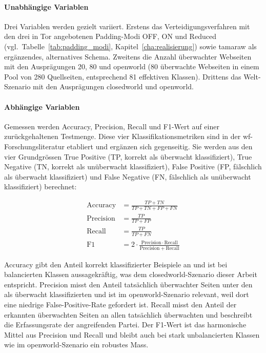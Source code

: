 \paragraph{Unabhängige Variablen}
Drei Variablen werden gezielt variiert.
Erstens das Verteidigungsverfahren mit den drei in Tor angebotenen Padding-Modi OFF, ON und Reduced (vgl.\ Tabelle~\ref{tab:padding_modi}, Kapitel~\ref{cha:realisierung}) sowie \gls{tamaraw} als ergänzendes, alternatives Schema.
Zweitens die Anzahl überwachter Webseiten mit den Ausprägungen 20, 80 und \gls{openworld} (80 überwachte Webseiten in einem Pool von 280 Quellseiten, entsprechend 81 effektiven Klassen).
Drittens das Welt-Szenario mit den Ausprägungen \gls{closedworld} und \gls{openworld}.

\paragraph{Abhängige Variablen}
Gemessen werden Accuracy, Precision, Recall und F1-Wert auf einer zurückgehaltenen Testmenge.
Diese vier Klassifikationsmetriken sind in der \gls{wf}-Forschungsliteratur etabliert und ergänzen sich gegenseitig.
Sie werden aus den vier Grundgrössen True Positive (TP, korrekt als überwacht klassifiziert), True Negative (TN, korrekt als unüberwacht klassifiziert), False Positive (FP, fälschlich als überwacht klassifiziert) und False Negative (FN, fälschlich als unüberwacht klassifiziert) berechnet:

\begin{align}
\mathrm{Accuracy}  &= \frac{TP + TN}{TP + TN + FP + FN} \\
\mathrm{Precision} &= \frac{TP}{TP + FP} \\
\mathrm{Recall}    &= \frac{TP}{TP + FN} \\
\mathrm{F1}        &= 2 \cdot \frac{\mathrm{Precision} \cdot \mathrm{Recall}}{\mathrm{Precision} + \mathrm{Recall}}
\end{align}

Accuracy gibt den Anteil korrekt klassifizierter Beispiele an und ist bei balancierten Klassen aussagekräftig, was dem \gls{closedworld}-Szenario dieser Arbeit entspricht.
Precision misst den Anteil tatsächlich überwachter Seiten unter den als überwacht klassifizierten und ist im \gls{openworld}-Szenario relevant, weil dort eine niedrige False-Positive-Rate gefordert ist.
Recall misst den Anteil der erkannten überwachten Seiten an allen tatsächlich überwachten und beschreibt die Erfassungsrate der angreifenden Partei.
Der F1-Wert ist das harmonische Mittel aus Precision und Recall und bleibt auch bei stark unbalancierten Klassen wie im \gls{openworld}-Szenario ein robustes Mass.

